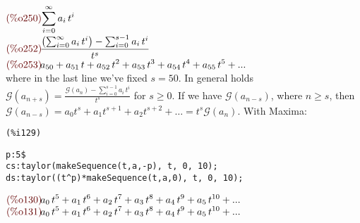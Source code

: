 \begin{math}\displaystyle
\parbox{8ex}{\color{labelcolor}(\%o250) }
\sum_{i=0}^{\infty }{a}_{i}\,{t}^{i}
\end{math}\\
\begin{math}\displaystyle
\parbox{8ex}{\color{labelcolor}(\%o252) }
\frac{\left( \sum_{i=0}^{\infty }{a}_{i}\,{t}^{i}\right) -\sum_{i=0}^{s-1}{a}_{i}\,{t}^{i}}{{t}^{s}}
\end{math}\\
\begin{math}\displaystyle
\parbox{8ex}{\color{labelcolor}(\%o253) }
{a}_{50}+{a}_{51}\,t+{a}_{52}\,{t}^{2}+{a}_{53}\,{t}^{3}+{a}_{54}\,{t}^{4}+{a}_{55}\,{t}^{5}+...
\end{math}\\
where in the last line we've fixed $s = 50$. In general holds
$\mathcal{G}(a_{n+s}) = \frac{\mathcal{G} (a_n)
  -\sum_{i=0}^{s-1}{a}_{i}\,{t}^{i}}{{t}^{s}}$ for $s \geq 0$. If we
have $\mathcal{G} (a_{n-s})$, where $n \geq s $, then $\mathcal{G}
(a_{n-s}) = a_0 t^s + a_1 t^{s+1} + a_2 t^{s+2} + \ldots
= t^s \mathcal{G} (a_n)$. With Maxima:\\

\noindent
\begin{minipage}[t]{8ex}{\color{red}\bf
\begin{verbatim}
(%i129) 
\end{verbatim}}
\end{minipage}
\begin{minipage}[t]{\textwidth}{\color{blue}
\begin{verbatim}
p:5$
cs:taylor(makeSequence(t,a,-p), t, 0, 10);
ds:taylor((t^p)*makeSequence(t,a,0), t, 0, 10);
\end{verbatim}}
\end{minipage}
\begin{math}\displaystyle
\parbox{8ex}{\color{labelcolor}(\%o130) }
{a}_{0}\,{t}^{5}+{a}_{1}\,{t}^{6}+{a}_{2}\,{t}^{7}+{a}_{3}\,{t}^{8}+{a}_{4}\,{t}^{9}+{a}_{5}\,{t}^{10}+...
\end{math}\\
\begin{math}\displaystyle
  \parbox{8ex}{\color{labelcolor}(\%o131) }
  {a}_{0}\,{t}^{5}+{a}_{1}\,{t}^{6}+{a}_{2}\,{t}^{7}+{a}_{3}\,{t}^{8}+{a}_{4}\,{t}^{9}+{a}_{5}\,{t}^{10}+...
\end{math}


